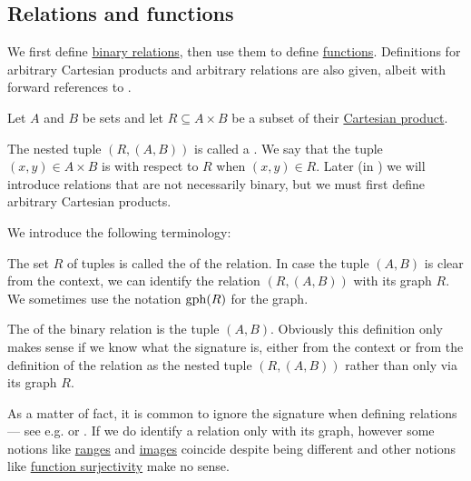 \subsection{Relations and functions}\label{subsec:relations_and_functions}

We first define \hyperref[def:binary_relation]{binary relations}, then use them to define \hyperref[def:function]{functions}. Definitions for arbitrary Cartesian products and arbitrary relations are also given, albeit with forward references to .

\begin{definition}\label{def:binary_relation}
  Let \( A \) and \( B \) be sets and let \( R \subseteq A \times B \) be a subset of their \hyperref[def:binary_cartesian_product]{Cartesian product}.

  The nested tuple \( (R,  (A, B)) \) is called a . We say that the tuple \( (x, y) \in A \times B \) is  with respect to \( R \) when \( (x, y) \in R \). Later (in ) we will introduce relations that are not necessarily binary, but we must first define arbitrary Cartesian products.

  We introduce the following terminology:
  \begin{thmenum}[series=def:binary_relation]
     The set \( R \) of tuples is called the  of the relation. In case the tuple \( (A, B) \) is clear from the context, we can identify the relation \( (R, (A, B)) \) with its graph \( R \). We sometimes use the notation \( \operatorname{gph}(R) \) for the graph.

     The  of the binary relation is the tuple \( (A, B) \). Obviously this definition only makes sense if we know what the signature is, either from the context or from the definition of the relation as the nested tuple \( (R, (A, B)) \) rather than only via its graph \( R \).

    As a matter of fact, it is common to ignore the signature when defining relations --- see e.g. \cite[7]{Kelley1955} or \cite[def. 2.1]{OpenLogicFull}. If we do identify a relation only with its graph, however some notions like \hyperref[def:binary_relation/range]{ranges} and \hyperref[def:binary_relation/image]{images} coincide despite being different and other notions like \hyperref[def:function_invertibility/surjective]{function surjectivity} make no sense.


\end{thmenum}
\end{definition}
